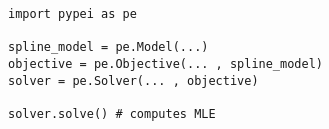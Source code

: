\documentclass{standalone}
\begin{document}
\begin{minipage}{\textwidth}
\begin{verbatim}
import pypei as pe

spline_model = pe.Model(...)
objective = pe.Objective(... , spline_model)
solver = pe.Solver(... , objective)

solver.solve() # computes MLE
\end{verbatim}
\end{minipage}
\end{document}
